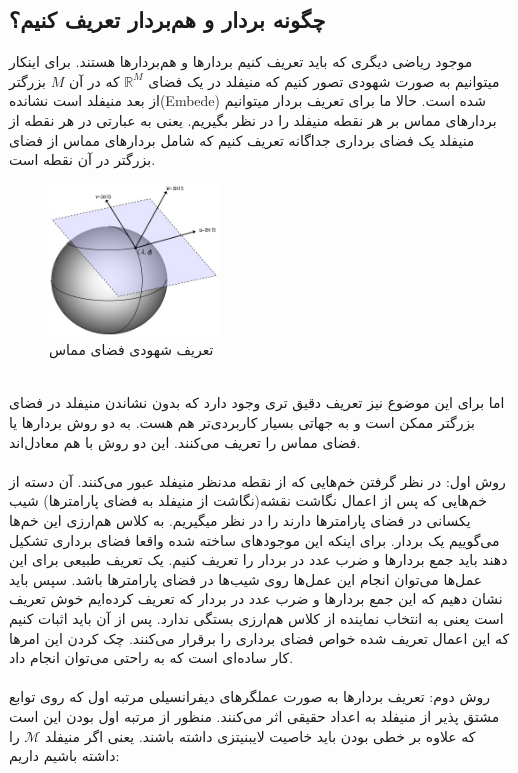 \subsection{چگونه بردار و ‌هم‌بردار تعریف کنیم؟}
موجود ریاضی دیگری که باید تعریف کنیم بردارها و هم‌بردارها هستند. برای اینکار میتوانیم به صورت شهودی تصور کنیم که منیفلد در یک فضای $\mathbb{R}^M$ که در آن $M$ بزرگتر از بعد منیفلد است نشانده(Embede) شده است. حالا ما برای تعریف بردار میتوانیم بردارهای مماس بر هر نقطه منیفلد را در نظر بگیریم. یعنی به عبارتی در هر نقطه از منیفلد یک فضای برداری جداگانه تعریف کنیم که شامل بردارهای مماس از فضای بزرگتر در آن نقطه است.
\begin{figure}[h!]
    \centering
    \includegraphics[width=0.4\textwidth]{Pictures/Q2/2.jpg}    
    \caption{تعریف شهودی فضای مماس}
\end{figure}\\
اما برای این موضوع نیز تعریف دقیق تری وجود دارد که بدون نشاندن منیفلد در فضای بزرگتر ممکن است و به جهاتی بسیار کاربردی‌تر هم هست. به دو روش بردارها یا فضای مماس را تعریف می‌کنند. این دو روش با هم معادل‌اند.\\
\\
روش اول: در نظر گرفتن خم‌هایی که از نقطه مدنظر منیفلد عبور می‌کنند. آن دسته از خم‌هایی که پس از اعمال نگاشت نقشه(نگاشت از منیفلد به فضای پارامترها) شیب یکسانی در فضای پارامترها دارند را در نظر میگیریم. به کلاس هم‌ارزی این خم‌ها می‌گوییم یک بردار. برای اینکه این موجودهای ساخته شده واقعا فضای برداری تشکیل دهند باید جمع بردارها و ضرب عدد در بردار را تعریف کنیم. یک تعریف طبیعی برای این عمل‌ها می‌توان انجام این عمل‌ها روی شیب‌ها در فضای پارامترها باشد. سپس باید نشان دهیم که این جمع بردارها و ضرب عدد در بردار که تعریف کرده‌ایم خوش تعریف است یعنی به انتخاب نماینده از کلاس هم‌ارزی بستگی ندارد. پس از آن باید اثبات کنیم که این اعمال تعریف شده خواص فضای برداری را برقرار می‌کنند. چک کردن این امرها کار ساده‌ای است که به راحتی می‌توان انجام داد.\\
\\
روش دوم: تعریف بردارها به صورت عملگرهای دیفرانسیلی مرتبه اول که روی توابع مشتق پذیر از منیفلد به اعداد حقیقی اثر می‌کنند. منظور از مرتبه اول بودن این است که علاوه بر خطی بودن باید خاصیت لایبنیتزی داشته باشند. یعنی اگر منیفلد $\mathcal{M}$ را داشته باشیم داریم:
